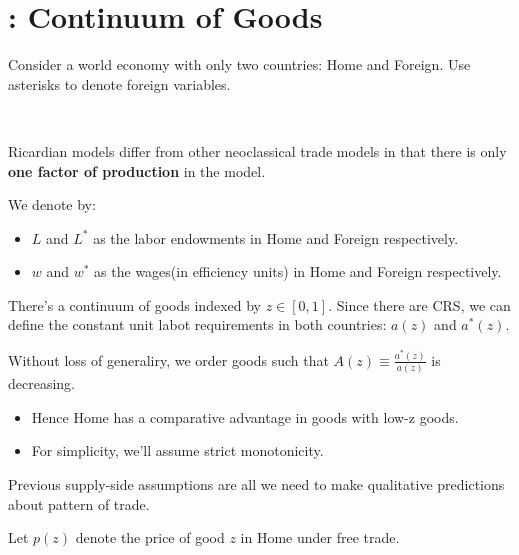 \section{\cite{dornbusch1977comparative}: Continuum of Goods}

Consider a world economy with only two countries: Home and Foreign.
Use asterisks to denote foreign variables. 
\begin{note}
    \

    Ricardian models diﬀer from other neoclassical trade models in that
    there is only \textbf{one factor of production} in the model.
\end{note}

We denote by:
\begin{itemize}
    \item $L$ and $L^*$ as the labor endowments in Home and Foreign respectively.
    \item $w$ and $w^*$ as the wages(in efficiency units) in Home and Foreign respectively.
\end{itemize}

There's a continuum of goods indexed by $z \in [0,1]$.
Since there are CRS, we can define the constant unit labot requirements in both countries: $a(z)$ and $a^*(z)$.

Without loss of generaliry, we order goods such that $A(z) \equiv \frac{a^*(z)}{a(z)}$ is decreasing.
\begin{itemize}
    \item Hence Home has a comparative advantage in goods with low-z goods.
    \item For simplicity, we'll assume strict monotonicity.
\end{itemize}

Previous supply-side assumptions are all we need to make qualitative
predictions about pattern of trade.

Let $p(z)$ denote the price of good $z$ in Home under free trade.

